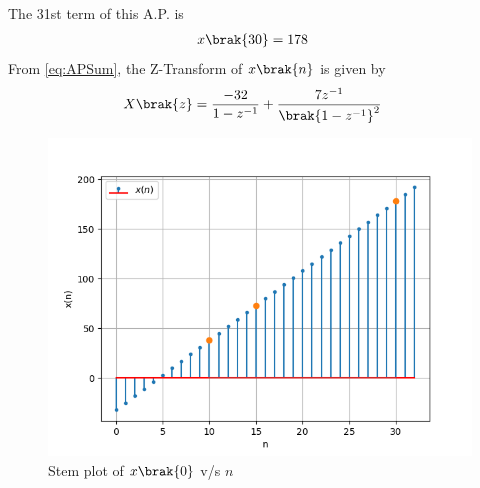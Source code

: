 \documentclass[journal,12pt,twocolumn]{IEEEtran}
\theoremstyle{remark}
\begin{document}
The 31st term of this A.P. is 
\begin{align}x\brak{30}&=178\end{align}
 From \eqref{eq:APSum}, the Z-Transform of $x\brak{n}$ is given by 
\begin{align}
    X\brak{z}&=\frac{-32}{1-z^{-1}}+\frac{7z^{-1}}{\brak{1-z^{-1}}^2}
\end{align}
 \begin{figure}[h]
    \centering
    \includegraphics[width=\columnwidth]{ncert-maths/10/5/2/7/figs/fig1.png}
    \caption{Stem plot of $x\brak{0}$ v/s $n$}
 \end{figure}
\end{document}
